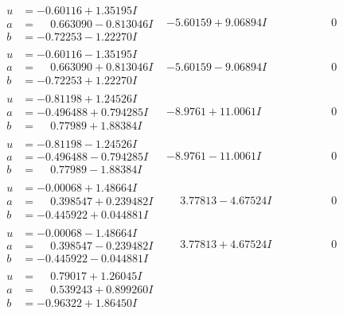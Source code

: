 \documentclass[1p]{elsarticle_modified}
\theoremstyle{definition}
\begin{document}
$$\begin{array}{c|c|c}
 \hline 
\begin{aligned}
u &= -0.60116 + 1.35195 I \\
a &= \phantom{-}0.663090 - 0.813046 I \\
b &= -0.72253 - 1.22270 I\end{aligned}
 & -5.60159 + 9.06894 I & \phantom{-0.000000 } 0 \\ \hline\begin{aligned}
u &= -0.60116 - 1.35195 I \\
a &= \phantom{-}0.663090 + 0.813046 I \\
b &= -0.72253 + 1.22270 I\end{aligned}
 & -5.60159 - 9.06894 I & \phantom{-0.000000 } 0 \\ \hline\begin{aligned}
u &= -0.81198 + 1.24526 I \\
a &= -0.496488 + 0.794285 I \\
b &= \phantom{-}0.77989 + 1.88384 I\end{aligned}
 & -8.9761 + 11.0061 I & \phantom{-0.000000 } 0 \\ \hline\begin{aligned}
u &= -0.81198 - 1.24526 I \\
a &= -0.496488 - 0.794285 I \\
b &= \phantom{-}0.77989 - 1.88384 I\end{aligned}
 & -8.9761 - 11.0061 I & \phantom{-0.000000 } 0 \\ \hline\begin{aligned}
u &= -0.00068 + 1.48664 I \\
a &= \phantom{-}0.398547 + 0.239482 I \\
b &= -0.445922 + 0.044881 I\end{aligned}
 & \phantom{-}3.77813 - 4.67524 I & \phantom{-0.000000 } 0 \\ \hline\begin{aligned}
u &= -0.00068 - 1.48664 I \\
a &= \phantom{-}0.398547 - 0.239482 I \\
b &= -0.445922 - 0.044881 I\end{aligned}
 & \phantom{-}3.77813 + 4.67524 I & \phantom{-0.000000 } 0 \\ \hline\begin{aligned}
u &= \phantom{-}0.79017 + 1.26045 I \\
a &= \phantom{-}0.539243 + 0.899260 I \\
b &= -0.96322 + 1.86450 I\end{aligned}

\end{array}$$
\end{document}
